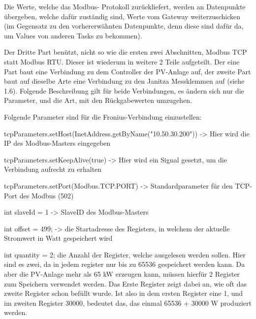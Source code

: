 Die Werte, welche das Modbus- Protokoll zurückliefert, werden an Datenpunkte übergeben, welche dafür zuständig sind, Werte vom Gateway weiterzuschicken (im Gegensatz zu den vorhererwähnten Datenpunkte, denn diese sind dafür da, um Values von anderen Tasks zu bekommen). 

Der Dritte Part benützt, nicht so wie die ersten zwei Abschnitten, Modbus TCP statt Modbus RTU. Dieser ist wiederum in weitere 2 Teile aufgeteilt. Der eine Part baut eine Verbindung zu dem Controller der PV-Anlage auf, der zweite Part baut auf dieselbe Arte eine Verbindung zu den Janitza Messklemmen auf (siehe 1.6). Folgende Beschreibung gilt für beide Verbindungen, es ändern sich nur die Parameter, und die Art, mit den Rückgabewerten umzugehen. 

Folgende Parameter sind für die Fronius-Verbindung einzustellen: 

\begin{compactitem}
  \item tcpParameters.setHost(InetAddress.getByName("10.50.30.200")) -> Hier wird die IP des Modbus-Masters eingegeben 
  \item tcpParameters.setKeepAlive(true) -> Hier wird ein Signal gesetzt, um die Verbindung aufrecht zu erhalten 
  \item tcpParameters.setPort(Modbus.TCP.PORT) -> Standardparameter für den TCP-Port des Modbus (502) 
  \item int slaveId = 1 -> SlaveID des Modbus-Masters 
  \item int offset = 499; -> die Startadresse des Registers, in welchem der aktuelle Stromwert in Watt gespeichert wird 
  \item int quantity = 2; die Anzahl der Register, welche ausgelesen werden sollen. Hier sind es zwei, da in jedem register nur bis zu 65536 gespeichert werden kann. Da aber die PV-Anlage mehr als 65 kW erzeugen kann, müssen hierfür 2 Register zum Speichern verwendet werden. Das Erste Register zeigt dabei an, wie oft das zweite Register schon befüllt wurde. Ist also in dem ersten Register eine 1, und im zweiten Register 30000, bedeutet das, das einmal 65536 + 30000 W produziert werden. 
\end{compactitem}

